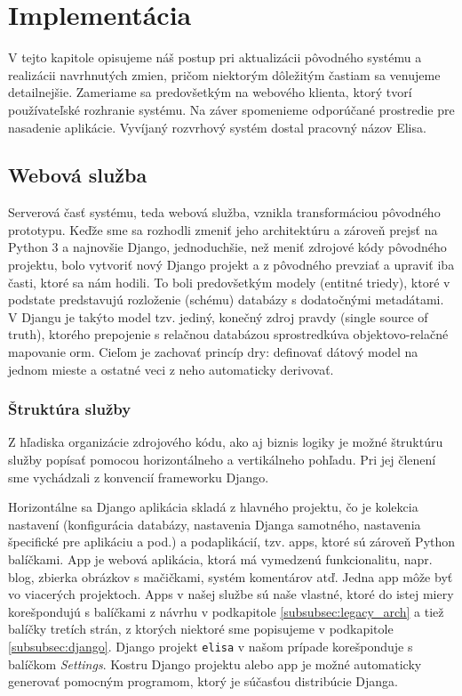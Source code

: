 \section{Implementácia}
\label{sec:implementation}

V tejto kapitole opisujeme náš postup pri aktualizácii pôvodného systému a
realizácii navrhnutých zmien, pričom niektorým dôležitým častiam sa venujeme
detailnejšie. Zameriame sa predovšetkým na webového klienta, ktorý tvorí
používateľské rozhranie systému. Na záver spomenieme odporúčané prostredie pre
nasadenie aplikácie. Vyvíjaný rozvrhový systém dostal pracovný názov Elisa.

\subsection{Webová služba}
\label{subsec:impl_server}

Serverová časť systému, teda webová služba, vznikla transformáciou pôvodného
prototypu. Keďže sme sa rozhodli zmeniť jeho architektúru a zároveň prejsť na
Python 3 a najnovšie Django, jednoduchšie, než meniť zdrojové kódy pôvodného
projektu, bolo vytvoriť nový Django projekt a z pôvodného prevziať a upraviť iba
časti, ktoré sa nám hodili. To boli predovšetkým modely (entitné triedy), ktoré
v podstate predstavujú rozloženie (schému) databázy s dodatočnými metadátami. V
Djangu je takýto model tzv. jediný, konečný zdroj pravdy (single source of
truth), ktorého prepojenie s relačnou databázou sprostredkúva objektovo-relačné
mapovanie \acrshort{orm}. Cieľom je zachovať princíp \acrshort{dry}: definovať
dátový model na jednom mieste a ostatné veci z neho automaticky derivovať.

\subsubsection{Štruktúra služby}

Z hľadiska organizácie zdrojového kódu, ako aj biznis logiky je možné štruktúru
služby popísať pomocou horizontálneho a vertikálneho pohľadu. Pri jej členení
sme vychádzali z konvencií frameworku Django.

Horizontálne sa Django aplikácia skladá z hlavného projektu, čo je kolekcia
nastavení (konfigurácia databázy, nastavenia Djanga samotného, nastavenia
špecifické pre aplikáciu a pod.) a podaplikácií, tzv. apps, ktoré sú zároveň
Python balíčkami. App je webová aplikácia, ktorá má vymedzenú funkcionalitu,
napr. blog, zbierka obrázkov s mačičkami, systém komentárov atď. Jedna app môže
byť vo viacerých projektoch. Apps v našej službe sú naše vlastné, ktoré do istej
miery korešpondujú s balíčkami z návrhu v podkapitole
\ref{subsubsec:legacy_arch} a tiež balíčky tretích strán, z ktorých niektoré sme
popisujeme v podkapitole \ref{subsubsec:django}. Django projekt \texttt{elisa} v
našom prípade korešponduje s balíčkom \emph{Settings}. Kostru Django projektu
alebo app je možné automaticky generovať pomocným programom, ktorý je súčasťou
distribúcie Djanga.

